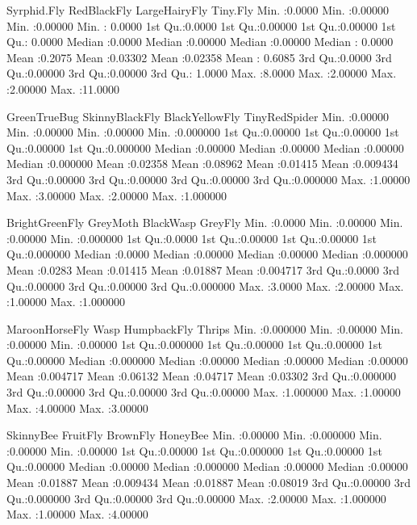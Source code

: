 \documentclass[11pt]{amsart}
\begin{document}
\begin{Schunk}
\begin{Soutput}
  Syrphid.Fly      RedBlackFly      LargeHairyFly        Tiny.Fly      
 Min.   :0.0000   Min.   :0.00000   Min.   :0.00000   Min.   : 0.0000  
 1st Qu.:0.0000   1st Qu.:0.00000   1st Qu.:0.00000   1st Qu.: 0.0000  
 Median :0.0000   Median :0.00000   Median :0.00000   Median : 0.0000  
 Mean   :0.2075   Mean   :0.03302   Mean   :0.02358   Mean   : 0.6085  
 3rd Qu.:0.0000   3rd Qu.:0.00000   3rd Qu.:0.00000   3rd Qu.: 1.0000  
 Max.   :8.0000   Max.   :2.00000   Max.   :2.00000   Max.   :11.0000  
                                                                       
  GreenTrueBug     SkinnyBlackFly    BlackYellowFly    TinyRedSpider     
 Min.   :0.00000   Min.   :0.00000   Min.   :0.00000   Min.   :0.000000  
 1st Qu.:0.00000   1st Qu.:0.00000   1st Qu.:0.00000   1st Qu.:0.000000  
 Median :0.00000   Median :0.00000   Median :0.00000   Median :0.000000  
 Mean   :0.02358   Mean   :0.08962   Mean   :0.01415   Mean   :0.009434  
 3rd Qu.:0.00000   3rd Qu.:0.00000   3rd Qu.:0.00000   3rd Qu.:0.000000  
 Max.   :1.00000   Max.   :3.00000   Max.   :2.00000   Max.   :1.000000  
                                                                         
 BrightGreenFly      GreyMoth         BlackWasp          GreyFly        
 Min.   :0.0000   Min.   :0.00000   Min.   :0.00000   Min.   :0.000000  
 1st Qu.:0.0000   1st Qu.:0.00000   1st Qu.:0.00000   1st Qu.:0.000000  
 Median :0.0000   Median :0.00000   Median :0.00000   Median :0.000000  
 Mean   :0.0283   Mean   :0.01415   Mean   :0.01887   Mean   :0.004717  
 3rd Qu.:0.0000   3rd Qu.:0.00000   3rd Qu.:0.00000   3rd Qu.:0.000000  
 Max.   :3.0000   Max.   :2.00000   Max.   :1.00000   Max.   :1.000000  
                                                                        
 MaroonHorseFly          Wasp          HumpbackFly          Thrips       
 Min.   :0.000000   Min.   :0.00000   Min.   :0.00000   Min.   :0.00000  
 1st Qu.:0.000000   1st Qu.:0.00000   1st Qu.:0.00000   1st Qu.:0.00000  
 Median :0.000000   Median :0.00000   Median :0.00000   Median :0.00000  
 Mean   :0.004717   Mean   :0.06132   Mean   :0.04717   Mean   :0.03302  
 3rd Qu.:0.000000   3rd Qu.:0.00000   3rd Qu.:0.00000   3rd Qu.:0.00000  
 Max.   :1.000000   Max.   :1.00000   Max.   :4.00000   Max.   :3.00000  
                                                                         
   SkinnyBee          FruitFly           BrownFly          HoneyBee      
 Min.   :0.00000   Min.   :0.000000   Min.   :0.00000   Min.   :0.00000  
 1st Qu.:0.00000   1st Qu.:0.000000   1st Qu.:0.00000   1st Qu.:0.00000  
 Median :0.00000   Median :0.000000   Median :0.00000   Median :0.00000  
 Mean   :0.01887   Mean   :0.009434   Mean   :0.01887   Mean   :0.08019  
 3rd Qu.:0.00000   3rd Qu.:0.000000   3rd Qu.:0.00000   3rd Qu.:0.00000  
 Max.   :2.00000   Max.   :1.000000   Max.   :1.00000   Max.   :4.00000  
                                                                         

\end{Soutput}
\end{Schunk}
\end{document}
